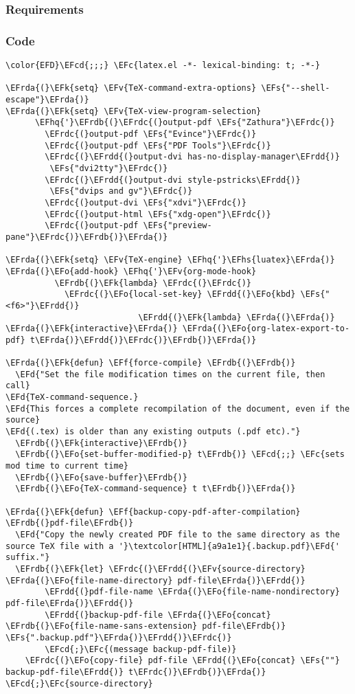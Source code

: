 \documentclass[a4wide,10pt]{article}
\newcommand{\EFc}[1]{\textcolor{EFc}{#1}} %
\newcommand{\EFcd}[1]{\textcolor{EFcd}{#1}} %
\newcommand{\EFs}[1]{\textcolor{EFs}{#1}} %
\newcommand{\EFd}[1]{\textcolor{EFd}{#1}} %
\newcommand{\EFk}[1]{\textcolor{EFk}{#1}} %
\newcommand{\EFf}[1]{\textcolor{EFf}{#1}} %
\newcommand{\EFv}[1]{\textcolor{EFv}{#1}} %
\newcommand{\EFo}[1]{\textcolor{EFo}{#1}} %
\newcommand{\EFhq}[1]{\textcolor{EFhq}{#1}} %
\newcommand{\EFhs}[1]{\textcolor{EFhs}{#1}} %
\newcommand{\EFrda}[1]{\textcolor{EFrda}{#1}} %
\newcommand{\EFrdb}[1]{\textcolor{EFrdb}{#1}} %
\newcommand{\EFrdc}[1]{\textcolor{EFrdc}{#1}} %
\newcommand{\EFrdd}[1]{\textcolor{EFrdd}{#1}} %
\begin{document}
\subsubsection{Requirements}
\label{sec:orgd845442}
\subsubsection{Code}
\label{sec:orge6b4d1d}
\begin{Code}
\begin{Verbatim}
\color{EFD}\EFcd{;;;} \EFc{latex.el -*- lexical-binding: t; -*-}

\EFrda{(}\EFk{setq} \EFv{TeX-command-extra-options} \EFs{"--shell-escape"}\EFrda{)}
\EFrda{(}\EFk{setq} \EFv{TeX-view-program-selection}
      \EFhq{'}\EFrdb{(}\EFrdc{(}output-pdf \EFs{"Zathura"}\EFrdc{)}
        \EFrdc{(}output-pdf \EFs{"Evince"}\EFrdc{)}
        \EFrdc{(}output-pdf \EFs{"PDF Tools"}\EFrdc{)}
        \EFrdc{(}\EFrdd{(}output-dvi has-no-display-manager\EFrdd{)}
         \EFs{"dvi2tty"}\EFrdc{)}
        \EFrdc{(}\EFrdd{(}output-dvi style-pstricks\EFrdd{)}
         \EFs{"dvips and gv"}\EFrdc{)}
        \EFrdc{(}output-dvi \EFs{"xdvi"}\EFrdc{)}
        \EFrdc{(}output-html \EFs{"xdg-open"}\EFrdc{)}
        \EFrdc{(}output-pdf \EFs{"preview-pane"}\EFrdc{)}\EFrdb{)}\EFrda{)}

\EFrda{(}\EFk{setq} \EFv{TeX-engine} \EFhq{'}\EFhs{luatex}\EFrda{)}
\EFrda{(}\EFo{add-hook} \EFhq{'}\EFv{org-mode-hook}
          \EFrdb{(}\EFk{lambda} \EFrdc{(}\EFrdc{)}
            \EFrdc{(}\EFo{local-set-key} \EFrdd{(}\EFo{kbd} \EFs{"<f6>"}\EFrdd{)}
                           \EFrdd{(}\EFk{lambda} \EFrda{(}\EFrda{)} \EFrda{(}\EFk{interactive}\EFrda{)} \EFrda{(}\EFo{org-latex-export-to-pdf} t\EFrda{)}\EFrdd{)}\EFrdc{)}\EFrdb{)}\EFrda{)}

\EFrda{(}\EFk{defun} \EFf{force-compile} \EFrdb{(}\EFrdb{)}
  \EFd{"Set the file modification times on the current file, then call}
\EFd{TeX-command-sequence.}
\EFd{This forces a complete recompilation of the document, even if the source}
\EFd{(.tex) is older than any existing outputs (.pdf etc)."}
  \EFrdb{(}\EFk{interactive}\EFrdb{)}
  \EFrdb{(}\EFo{set-buffer-modified-p} t\EFrdb{)} \EFcd{;;} \EFc{sets mod time to current time}
  \EFrdb{(}\EFo{save-buffer}\EFrdb{)}
  \EFrdb{(}\EFo{TeX-command-sequence} t t\EFrdb{)}\EFrda{)}

\EFrda{(}\EFk{defun} \EFf{backup-copy-pdf-after-compilation} \EFrdb{(}pdf-file\EFrdb{)}
  \EFd{"Copy the newly created PDF file to the same directory as the source TeX file with a '}\textcolor[HTML]{a9a1e1}{.backup.pdf}\EFd{' suffix."}
  \EFrdb{(}\EFk{let} \EFrdc{(}\EFrdd{(}\EFv{source-directory} \EFrda{(}\EFo{file-name-directory} pdf-file\EFrda{)}\EFrdd{)}
        \EFrdd{(}pdf-file-name \EFrda{(}\EFo{file-name-nondirectory} pdf-file\EFrda{)}\EFrdd{)}
        \EFrdd{(}backup-pdf-file \EFrda{(}\EFo{concat} \EFrdb{(}\EFo{file-name-sans-extension} pdf-file\EFrdb{)} \EFs{".backup.pdf"}\EFrda{)}\EFrdd{)}\EFrdc{)}
        \EFcd{;}\EFc{(message backup-pdf-file)}
    \EFrdc{(}\EFo{copy-file} pdf-file \EFrdd{(}\EFo{concat} \EFs{""} backup-pdf-file\EFrdd{)} t\EFrdc{)}\EFrdb{)}\EFrda{)} \EFcd{;}\EFc{source-directory}



\end{Verbatim}
\end{Code}
\end{document}
